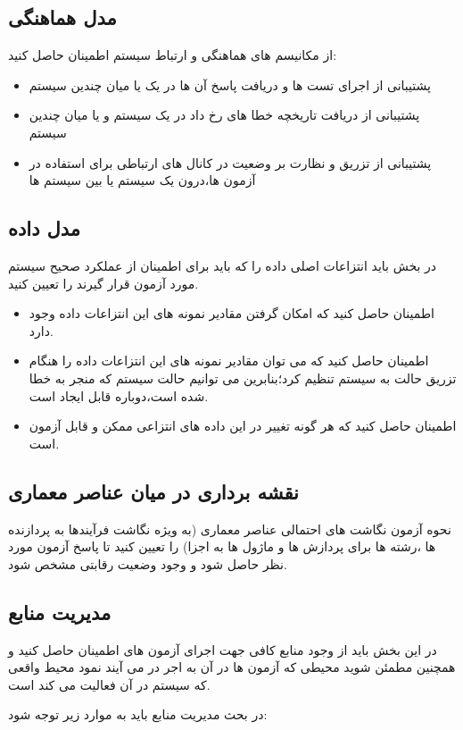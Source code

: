 \subsection{مدل هماهنگی}
از مکانیسم های هماهنگی و ارتباط سیستم اطمینان حاصل کنید:
\begin{itemize}
\item
پشتیبانی از اجرای تست ها و دریافت پاسخ آن ها در یک یا میان چندین سیستم
\item
پشتیبانی از دریافت تاریخچه خطا های رخ داد در یک سیستم و یا میان چندین سیستم
\item
پشتیبانی از تزریق و نظارت بر وضعیت در کانال های ارتباطی برای استفاده در آزمون ها،‌درون یک سیستم یا بین سیستم ها
\end{itemize}
\subsection{مدل داده}
در بخش باید انتزاعات اصلی داده را که باید برای اطمینان از عملکرد صحیح سیستم مورد آزمون قرار گیرند را تعیین کنید.
\begin{itemize}
\item
اطمینان حاصل کنید که امکان گرفتن مقادیر نمونه های این انتزاعات داده وجود دارد.
\item
اطمینان حاصل کنید که می توان مقادیر نمونه های این انتزاعات داده را هنگام تزریق حالت به سیستم تنظیم کرد؛‌بنابرین می توانیم حالت سیستم که منجر به خطا شده است،‌دوباره قابل ایجاد است.
\item
اطمینان حاصل کنید که هر گونه تغییر در این داده های انتزاعی ممکن و قابل آزمون است.
\end{itemize}
\subsection{نقشه برداری در میان عناصر معماری}
نحوه آزمون نگاشت های احتمالی عناصر معماری (به ویژه نگاشت فرآیندها به پردازنده ها ،‌رشته ها برای پردازش ها و ماژول ها به اجزا) را تعیین کنید تا پاسخ آزمون مورد نظر حاصل شود و وجود وضعیت رقابتی مشخص شود.
\subsection{مدیریت منابع}
در این بخش باید از وجود منابع کافی جهت اجرای آزمون های اطمینان حاصل کنید و همچنین مطمئن شوید محیطی که آزمون ها در آن به اجر در می آیند نمود محیط واقعی که سیستم در آن فعالیت می کند است.

در بحث مدیریت منابع باید به موارد زیر توجه شود:


